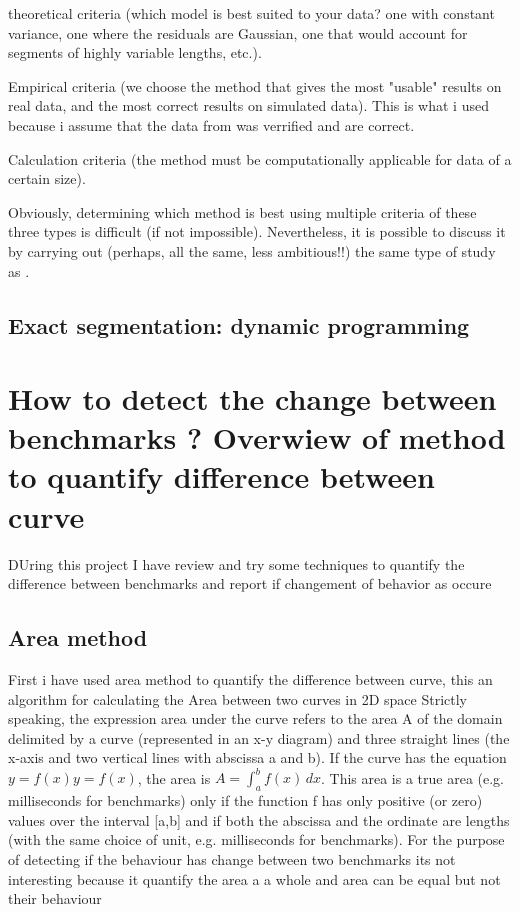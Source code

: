\documentclass{article}
\begin{document}
theoretical criteria (which model is best suited to your data? one with constant variance, one where the residuals are Gaussian, one that would account for segments of highly variable lengths, etc.).

Empirical criteria (we choose the method that gives the most "usable" results on real data, and the most correct results on simulated data). This is what i used because i assume that the data from \cite{barrett2017virtual} was verrified and are correct.

Calculation criteria (the method must be computationally applicable for data of a certain size).

Obviously, determining which method is best using multiple criteria of these three types is difficult (if not impossible). Nevertheless, it is possible to discuss it by carrying out (perhaps, all the same, less ambitious!!) the same type of study as \cite{leviandier2012comparison}.


\subsection{Exact segmentation: dynamic programming}



\section{ How to detect the change between benchmarks ? Overwiew of method to quantify difference between curve}

DUring this project I have review and try some techniques to quantify the difference between benchmarks and report if changement of behavior as occure

\subsection{Area method}

First i have used area method to quantify the difference between curve, this an algorithm for calculating the Area between two curves in 2D space
Strictly speaking, the expression area under the curve refers to the area A of the domain delimited by a curve (represented in an x-y diagram) and three straight lines (the x-axis and two vertical lines with abscissa a and b). If the curve has the equation $y=f(x) y=f(x)$, the area is $A=\int _{a}^{b}f(x)\, {d} x$. This area is a true area (e.g. milliseconds for benchmarks) only if the function f has only positive (or zero) values over the interval [a,b] and if both the abscissa and the ordinate are lengths (with the same choice of unit, e.g. milliseconds for benchmarks).
For the purpose of detecting if the behaviour has change between two benchmarks its not interesting because it quantify the area a a whole and area can be equal but not their behaviour
\end{document}
